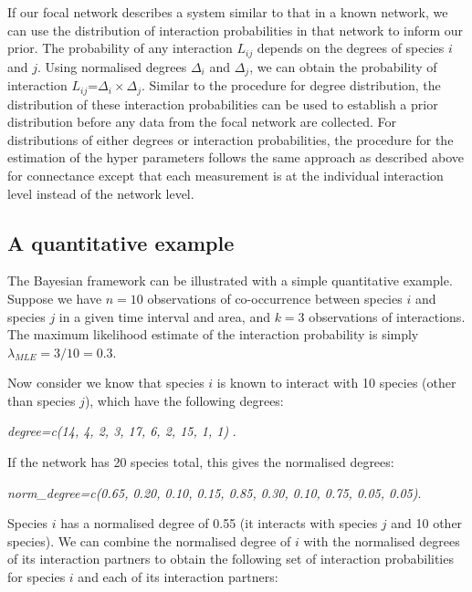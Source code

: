 \documentclass[12pt]{article}
\begin{document}
    If our focal network describes a system similar to that in a known network, we can use the distribution of interaction probabilities in that network to inform our prior. The probability of any interaction $L_{ij}$ depends on the degrees of species $i$ and $j$. Using normalised degrees $\Delta_i$ and $\Delta_j$, we can obtain the probability of interaction $L_{ij}$=$\Delta_i\times\Delta_j$. Similar to the procedure for degree distribution, the distribution of these interaction probabilities can be used to establish a prior distribution before any data from the focal network are collected. For distributions of either degrees or interaction probabilities, the procedure for the estimation of the hyper parameters follows the same approach as described above for connectance except that each measurement is at the individual interaction level instead of the network level.


    \subsection*{A quantitative example}

      The Bayesian framework can be illustrated with a simple quantitative example. Suppose we have $n = 10$ observations of co-occurrence between species $i$ and species $j$ in a given time interval and area, and $k = 3$ observations of interactions. The maximum likelihood estimate of the interaction probability is simply $\lambda_{MLE} = 3/10 = 0.3$. 
      

      Now consider we know that species $i$ is known to interact with 10 species (other than species $j$), which have the following degrees:

        \vspace{12pt}
        \noindent\emph{
          degree=c(14, 4, 2, 3, 17, 6, 2, 15, 1, 1)
            }.
          \vspace{12pt}

        If the network has 20 species total, this gives the normalised degrees:

        \vspace{12pt}
        \noindent\emph{
          norm\_degree=c(0.65, 0.20, 0.10, 0.15, 0.85, 0.30, 0.10, 0.75, 0.05, 0.05)}.
          \vspace{12pt}

        Species $i$ has a normalised degree of 0.55 (it interacts with species $j$ and 10 other species). We can combine the normalised degree of $i$ with the normalised degrees of its interaction partners to obtain the following set of interaction probabilities for species $i$ and each of its interaction partners:
\end{document}
